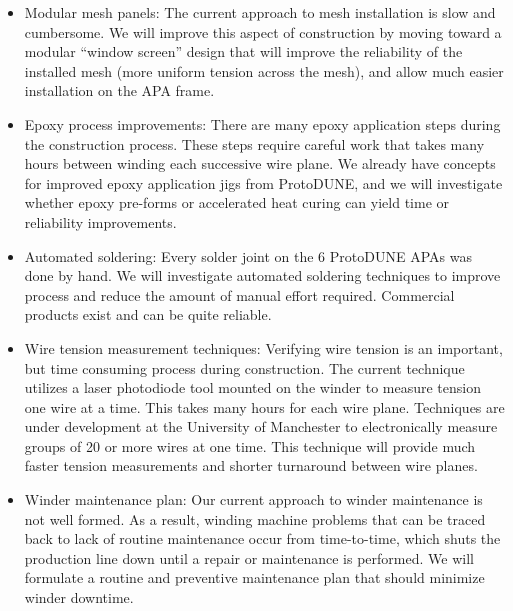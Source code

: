 \begin{itemize}
\begin{dunefigure}{fig:winding-dev}
{Winding machine design development.}
\texttt{[image: Winding-machine-design-development.jpg]} 
\end{dunefigure}

\item Modular mesh panels: The current approach to mesh installation is slow and cumbersome. We will improve this aspect of construction by moving toward a modular ``window screen'' design that will improve the reliability of the installed mesh (more uniform tension across the mesh), and allow much easier installation on the APA frame.

\item Epoxy process improvements: There are many epoxy application steps during the construction process. These steps require careful work that takes many hours between winding each successive wire plane. We already have concepts for improved epoxy application jigs from ProtoDUNE, and we will investigate whether epoxy pre-forms or accelerated heat curing can yield time or reliability improvements.

\item Automated soldering: Every solder joint on the 6 ProtoDUNE APAs was done by hand. We will investigate automated soldering techniques to improve process and reduce the amount of manual effort required. Commercial products exist and can be quite reliable.

\item Wire tension measurement techniques: Verifying wire tension is an important, but time consuming process during construction. The current technique utilizes a laser photodiode tool mounted on the winder to measure tension one wire at a time. This takes many hours for each wire plane. Techniques are under development at the University of Manchester to electronically measure groups of 20 or more wires at one time. This technique will provide much faster tension measurements and shorter turnaround between wire planes. 

\item Winder maintenance plan: Our current approach to winder maintenance is not well formed. As a result, winding machine problems that can be traced back to lack of routine maintenance occur from time-to-time, which shuts the production line down until a repair or maintenance is performed. We will formulate a routine and preventive maintenance plan that should minimize winder downtime.
\end{itemize}

